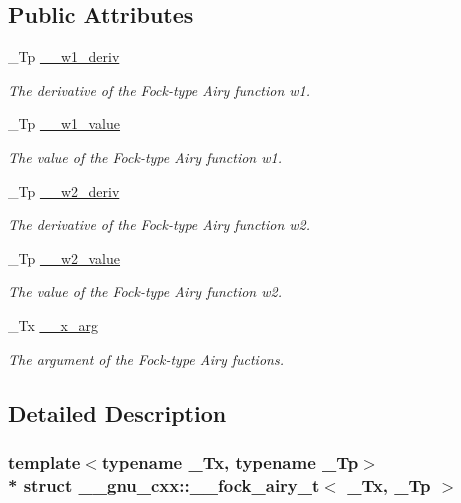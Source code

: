 \subsection*{Public Attributes}
\begin{DoxyCompactItemize}
\item 
\+\_\+\+Tp \hyperlink{struct____gnu__cxx_1_1____fock__airy__t_a10282e35a955f37373aa5bbe45bc4531}{\+\_\+\+\_\+w1\+\_\+deriv}
\begin{DoxyCompactList}\small\item\em The derivative of the Fock-\/type Airy function w1. \end{DoxyCompactList}\item 
\+\_\+\+Tp \hyperlink{struct____gnu__cxx_1_1____fock__airy__t_a26faefea72b5ae8bb06578a9f7eaa66d}{\+\_\+\+\_\+w1\+\_\+value}
\begin{DoxyCompactList}\small\item\em The value of the Fock-\/type Airy function w1. \end{DoxyCompactList}\item 
\+\_\+\+Tp \hyperlink{struct____gnu__cxx_1_1____fock__airy__t_abcd255990d6386453d48c5fbef224e26}{\+\_\+\+\_\+w2\+\_\+deriv}
\begin{DoxyCompactList}\small\item\em The derivative of the Fock-\/type Airy function w2. \end{DoxyCompactList}\item 
\+\_\+\+Tp \hyperlink{struct____gnu__cxx_1_1____fock__airy__t_a305b6edec1ae08bcbc3b486720410283}{\+\_\+\+\_\+w2\+\_\+value}
\begin{DoxyCompactList}\small\item\em The value of the Fock-\/type Airy function w2. \end{DoxyCompactList}\item 
\+\_\+\+Tx \hyperlink{struct____gnu__cxx_1_1____fock__airy__t_a383d76e48d9f70a90cab2cb8a2f1032d}{\+\_\+\+\_\+x\+\_\+arg}
\begin{DoxyCompactList}\small\item\em The argument of the Fock-\/type Airy fuctions. \end{DoxyCompactList}\end{DoxyCompactItemize}


\subsection{Detailed Description}
\subsubsection*{template$<$typename \+\_\+\+Tx, typename \+\_\+\+Tp$>$\\*
struct \+\_\+\+\_\+gnu\+\_\+cxx\+::\+\_\+\+\_\+fock\+\_\+airy\+\_\+t$<$ \+\_\+\+Tx, \+\_\+\+Tp $>$}

